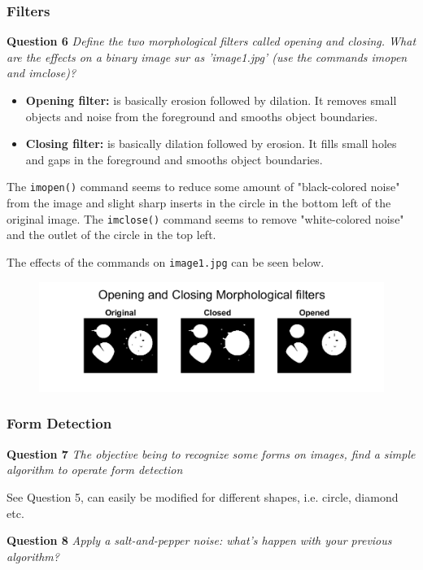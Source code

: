 \subsubsection{Filters}
\textbf{Question 6} \textit{Deﬁne the two morphological ﬁlters called opening and closing. What are the eﬀects on a binary image sur as ’image1.jpg’ (use the commands imopen and imclose)?}

\begin{itemize}
    \item \textbf{Opening filter:} is basically erosion followed by dilation. It removes small objects and noise from the foreground and smooths object boundaries.

    \item  \textbf{Closing filter:} is basically dilation followed by erosion. It fills small holes and gaps in the foreground and smooths object boundaries.    
\end{itemize}


The \texttt{imopen()} command seems to reduce some amount of "black-colored noise" from the image and slight sharp inserts in the circle in the bottom left of the original image. The \texttt{imclose()} command seems to remove "white-colored noise" and the outlet of the circle in the top left.

The effects of the commands on \texttt{image1.jpg} can be seen below.

\begin{figure}[H]
    \centering
    \includegraphics[width=0.75\linewidth]{Doc/Graphics/Part2/part2_Q6.png}
\end{figure}

\subsubsection{Form Detection}
\textbf{Question 7} \textit{The objective being to recognize some forms on images, ﬁnd a simple algorithm to operate form detection}

See Question 5, can easily be modified for different shapes, i.e. circle, diamond etc.


\textbf{Question 8} \textit{Apply a salt-and-pepper noise: what’s happen with your previous algorithm?}

